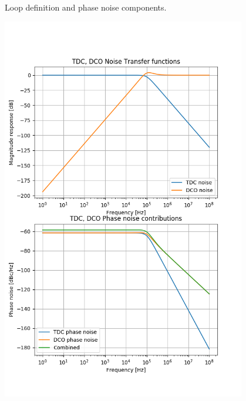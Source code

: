 \documentclass[t, screen, aspectratio=43]{beamer}
\begin{document}
\begin{frame}
\begin{block}{Loop definition and phase noise components.}
\begin{minipage}{7cm}
		\end{minipage}%
		\begin{minipage}{5cm}
			\center
			\includegraphics[width=0.8\textwidth, angle=0]{phase_noise_curves.png}
		\end{minipage}%
	\end{block}
\end{frame}
\end{document}
